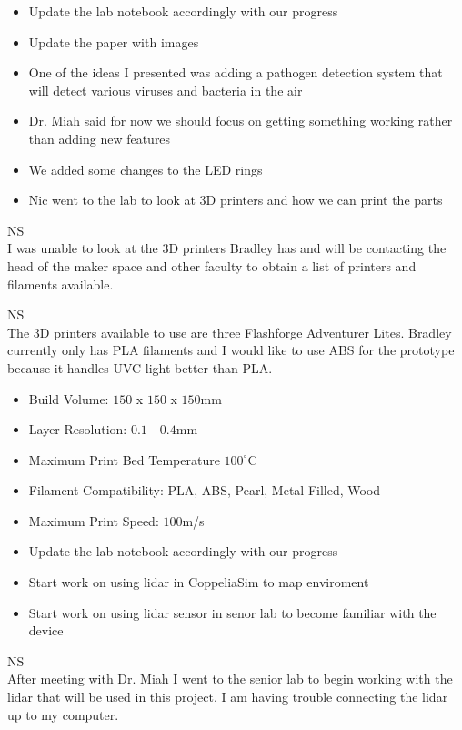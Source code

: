 \documentclass[fontsize=11pt, %
                             paper=a4, %
                             twoside, %
                             captions=tableheading,
                             index=totoc,
                             hyperref]{labbook}
\begin{document}
\begin{addmargin}[0cm]{0cm}
\begin{itemize}
\item Update the lab notebook accordingly with our progress
\item Update the paper with images
\item One of the ideas I presented was adding a pathogen detection system that will detect various viruses and bacteria in the air
\item Dr. Miah said for now we should focus on getting something working rather than adding new features
\end{itemize}
\begin{itemize}
\item We added some changes to the LED rings
\item Nic went to the lab to look at 3D printers and how we can print the parts
\end{itemize}

NS\\ 
I was unable to look at the 3D printers Bradley has and will be contacting the head of the maker space and other faculty to obtain a list of printers and filaments available.

NS\\ 
The 3D printers available to use are three Flashforge Adventurer Lites. Bradley currently only has PLA filaments and I would like to use ABS for the prototype because it handles UVC light better than PLA.
\begin{itemize}
\item Build Volume: $150$ x $150$ x $150$mm
\item Layer Resolution: $0.1$ - $0.4$mm
\item Maximum Print Bed Temperature $100^\circ$C
\item Filament Compatibility: PLA, ABS, Pearl, Metal-Filled, Wood
\item Maximum Print Speed: $100$m/s
\end{itemize}


\begin{itemize}
\item Update the lab notebook accordingly with our progress
\item Start work on using lidar in CoppeliaSim to map enviroment
\item Start work on using lidar sensor in senor lab to become familiar with the device
\end{itemize}
NS\\ 
After meeting with Dr. Miah I went to the senior lab to begin working with the lidar that will be used in this project. I am having trouble connecting the lidar up to my computer.



\end{addmargin}
\end{document}
